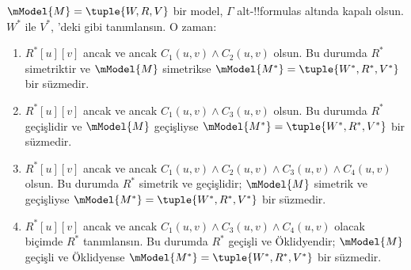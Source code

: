 \begin{thm}
  $\mModel{M}=\tuple{W,R,V}$ bir model, $\Gamma$ alt-!!{formula}s altında
  kapalı olsun. $W^*$ ile $V^*$, 'deki gibi
  tanımlansın. O zaman:
  \begin{enumerate}
  \item $R^*[u][v]$ ancak ve ancak $C_1(u,v)\land C_2(u,v)$ olsun.
    Bu durumda $R^*$ simetriktir ve $\mModel{M}$ simetrikse
    $\mModel{M^*}=\tuple{W^*,R^*,V^*}$ bir süzmedir.
  \item $R^*[u][v]$ ancak ve ancak $C_1(u,v)\land C_3(u,v)$ olsun.
    Bu durumda $R^*$ geçişlidir ve $\mModel{M}$ geçişliyse
    $\mModel{M^*}=\tuple{W^*,R^*,V^*}$ bir süzmedir.
  \item $R^*[u][v]$ ancak ve ancak $C_1(u,v)\land C_2(u,v)
    \land C_3(u,v)\land C_4(u,v)$ olsun. Bu durumda $R^*$ simetrik ve
    geçişlidir; $\mModel{M}$ simetrik ve geçişliyse
    $\mModel{M^*}=\tuple{W^*,R^*,V^*}$ bir süzmedir.
  \item $R^*[u][v]$ ancak ve ancak $C_1(u,v)\land C_3(u,v)
    \land C_4(u,v)$ olacak biçimde $R^*$ tanımlansın. Bu durumda $R^*$
    geçişli ve Öklidyendir; $\mModel{M}$ geçişli ve Öklidyense
    $\mModel{M^*}=\tuple{W^*,R^*,V^*}$ bir süzmedir.
  \end{enumerate}
\end{thm}

